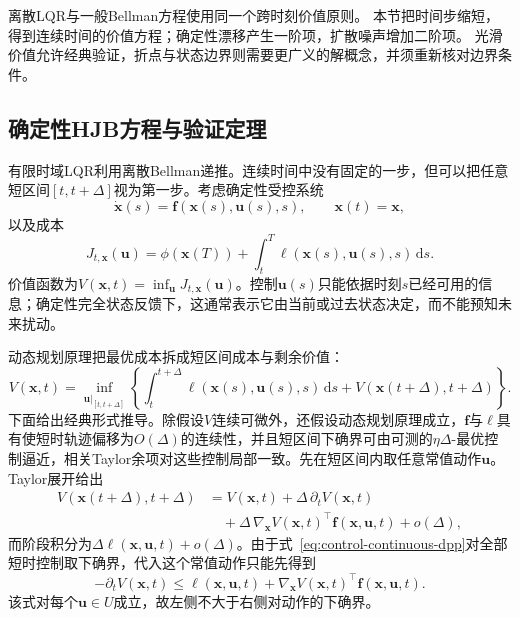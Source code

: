 离散LQR与一般Bellman方程使用同一个跨时刻价值原则。
本节把时间步缩短，得到连续时间的价值方程；确定性漂移产生一阶项，扩散噪声增加二阶项。
光滑价值允许经典验证，折点与状态边界则需要更广义的解概念，并须重新核对边界条件。
\subsection{确定性HJB方程与验证定理}
有限时域LQR利用离散Bellman递推。连续时间中没有固定的一步，但可以把任意短区间$[t,t+\Delta]$视为第一步。考虑确定性受控系统
\begin{equation}
  \dot{\bm{x}}(s)
  =
  \bm{f}(\bm{x}(s),\bm{u}(s),s),
  \qquad
  \bm{x}(t)=\bm{x},
  \label{eq:control-continuous-dynamics}
\end{equation}
以及成本
\begin{equation}
  J_{t,\bm{x}}(\bm{u})
  =
  \phi(\bm{x}(T))
  +
  \int_t^T
  \ell(\bm{x}(s),\bm{u}(s),s)\,\mathrm{d}s.
  \label{eq:control-continuous-cost}
\end{equation}
价值函数为$V(\bm{x},t)=\inf_{\bm{u}}J_{t,\bm{x}}(\bm{u})$。控制$\bm{u}(s)$只能依据时刻$s$已经可用的信息；确定性完全状态反馈下，这通常表示它由当前或过去状态决定，而不能预知未来扰动。

动态规划原理把最优成本拆成短区间成本与剩余价值：
\begin{equation}
  V(\bm{x},t)
  =
  \inf_{\bm{u}|_{[t,t+\Delta]}}
  \left\{
    \int_t^{t+\Delta}
    \ell(\bm{x}(s),\bm{u}(s),s)\,\mathrm{d}s
    +
    V(\bm{x}(t+\Delta),t+\Delta)
  \right\}.
  \label{eq:control-continuous-dpp}
\end{equation}
下面给出经典形式推导。除假设$V$连续可微外，还假设动态规划原理成立，$\bm{f}$与$\ell$具有使短时轨迹偏移为$O(\Delta)$的连续性，并且短区间下确界可由可测的$\eta\Delta$-最优控制逼近，相关Taylor余项对这些控制局部一致。先在短区间内取任意常值动作$\bm{u}$。Taylor展开给出
\begin{align*}
  V(\bm{x}(t+\Delta),t+\Delta)
  &=
  V(\bm{x},t)
  +
  \Delta\,\partial_t V(\bm{x},t)\\
  &\quad+
  \Delta\,
  \nabla_{\bm{x}}V(\bm{x},t)^{\top}
  \bm{f}(\bm{x},\bm{u},t)
  +o(\Delta),
\end{align*}
而阶段积分为$\Delta\ell(\bm{x},\bm{u},t)+o(\Delta)$。由于式~\eqref{eq:control-continuous-dpp}对全部短时控制取下确界，代入这个常值动作只能先得到
\[
  -\partial_tV(\bm{x},t)
  \leq
  \ell(\bm{x},\bm{u},t)
  +
  \nabla_{\bm{x}}V(\bm{x},t)^{\top}
  \bm{f}(\bm{x},\bm{u},t).
\]
该式对每个$\bm{u}\in U$成立，故左侧不大于右侧对动作的下确界。

